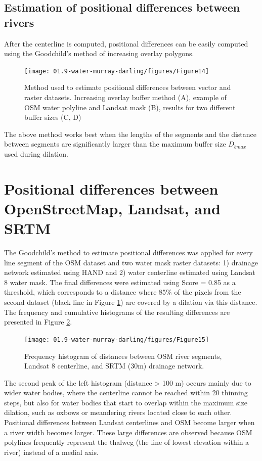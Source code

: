 \subsection{Estimation of positional differences between rivers}
After the centerline is computed, positional differences can be easily computed using the Goodchild’s method of increasing overlay polygons.

\begin{figure}
	\centering
	\texttt{[image: 01.9-water-murray-darling/figures/Figure14]}
	\caption{Method used to estimate positional differences between vector and raster datasets. Increasing overlay buffer method (A), example of OSM water polyline and Landsat mask (B), results for two different buffer sizes (C, D)}
	\label{fig:au-positional-accurracy-method}
\end{figure}

The above method works best when the lengths of the segments and the distance between segments are significantly larger than the maximum buffer size $D_{bmax}$ used during dilation. 

\section {Positional differences between OpenStreetMap, Landsat, and SRTM}
The Goodchild’s method to estimate positional differences was applied for every line segment of the OSM dataset and two water mask raster datasets: 1) drainage network estimated using HAND and 2) water centerline estimated using Landsat 8 water mask. The final differences were estimated using Score = 0.85 as a threshold, which corresponds to a distance where 85\% of the pixels from the second dataset (black line in Figure \ref{fig:au-positional-accurracy-method}) are covered by a dilation via this distance. The frequency and cumulative histograms of the resulting differences are presented in Figure \ref{fig:au-positional-differences}. 

\begin{figure}
	\centering
	\texttt{[image: 01.9-water-murray-darling/figures/Figure15]}
	\caption{Frequency histogram of distances between OSM river segments, Landsat 8 centerline, and SRTM (30m) drainage network.}
	\label{fig:au-positional-differences}
\end{figure}
 
The second peak of the left histogram (distance > 100 m) occurs mainly due to wider water bodies, where the centerline cannot be reached within 20 thinning steps, but also for water bodies that start to overlap within the maximum size dilation, such as oxbows or meandering rivers located close to each other.  Positional differences between Landsat centerlines and OSM become larger when a river width becomes larger. These large differences are observed because OSM polylines frequently represent the thalweg (the line of lowest elevation within a river) instead of a medial axis.

